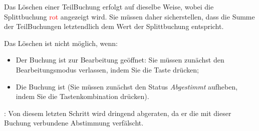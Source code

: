 Das Löschen einer TeilBuchung erfolgt auf dieselbe Weise, wobei die Splittbuchung \textcolor{red}{rot} angezeigt wird. Sie müssen daher sicherstellen, dass die Summe der TeilBuchungen letztendlich dem Wert der Splittbuchung entspricht.

Das Löschen ist nicht möglich, wenn:
\begin{itemize}
	\item Der Buchung ist zur Bearbeitung geöffnet: Sie müssen zunächst den Bearbeitungsmodus verlassen, indem Sie die Taste  drücken;
	\item Die Buchung ist  (Sie müssen zunächst den Status \emph{Abgestimmt} aufheben, indem Sie die Tastenkombination  drücken).
\end{itemize}

\Attention{}: Von diesem letzten Schritt wird dringend abgeraten, da er die mit dieser Buchung verbundene Abstimmung verfälscht.


